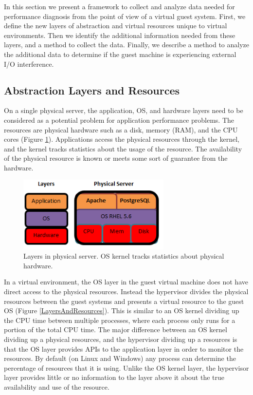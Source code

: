 In this section we present a framework to collect and analyze data needed for performance diagnosis from the point of view of a virtual guest system. 
First, we define the new layers of abstraction and virtual resources unique to virtual environments.  
Then we identify the additional information needed from these layers, and a method to collect the data.
Finally, we describe a method to analyze the additional data to determine if the guest machine is experiencing external I/O interference.

\subsection{Abstraction Layers and Resources}
On a single physical server, the application, OS, and hardware layers need to be considered as a potential problem for application performance problems.  The resources are physical hardware such as a disk, memory (RAM), and the CPU cores (Figure \ref{PhysicalLayers}).  Applications access the physical resources through the kernel, and the kernel tracks statistics about the usage of the resource.  The availability of the physical resource is known or meets some sort of guarantee from the hardware.

\begin{figure}[!h]
  \includegraphics[width=3in]{images/LayersPhysical.png}
  \caption{Layers in physical server.  OS kernel tracks statistics about physical hardware.}
  \label{PhysicalLayers}
\end{figure}

In a virtual environment, the OS layer in the guest virtual machine does not have direct access to the physical resources.  Instead the hypervisor divides the physical resources between the guest systems and presents a virtual resource to the guest OS (Figure \ref{LayersAndResources}).
This is similar to an OS kernel dividing up the CPU time between multiple processes, where each process only runs for a portion of the total CPU time.  
The major difference between an OS kernel dividing up a physical resources, and the hypervisor dividing up a resources is that the OS layer provides APIs to the application layer in order to monitor the resources.  By default (on Linux and Windows) any process can determine the percentage of resources that it is using.  Unlike the OS kernel layer, the hypervisor layer provides little or no information to the layer above it about the true availability and use of the resource. 

